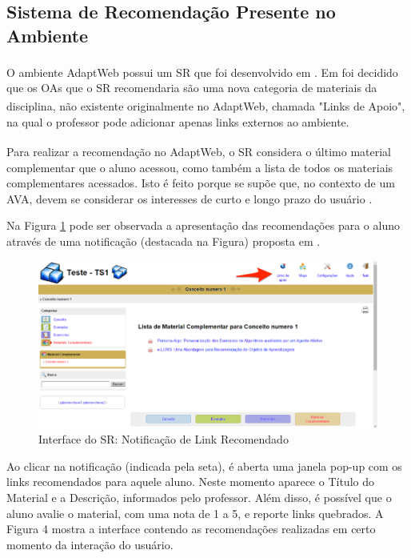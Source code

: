 \subsection{Sistema de Recomendação Presente no Ambiente}

O ambiente AdaptWeb\textsuperscript{\textregistered} possui um SR que foi desenvolvido em . Em 
foi decidido que os OAs que o SR recomendaria são uma nova categoria de materiais da disciplina, não existente
originalmente no AdaptWeb\textsuperscript{\textregistered}, chamada "Links de Apoio", na qual o professor pode adicionar apenas links externos ao ambiente.

Para realizar a recomendação no AdaptWeb\textsuperscript{\textregistered}, o SR considera o último material complementar
que o aluno acessou, como também a lista de todos os materiais complementares acessados. Isto é feito porque se supõe
que, no contexto de um AVA, devem se considerar os interesses de curto e longo prazo do usuário \cite{xiang2010temporal}.

Na Figura \ref{fig:adaptweb-notificacao-recomendacao} pode ser observada a apresentação das recomendações para o aluno
através de uma notificação (destacada na Figura) proposta em .

\begin{figure}[htb]
  \caption{\label{fig:adaptweb-notificacao-recomendacao}Interface do SR: Notificação de Link Recomendado}
  \begin{center}
      \includegraphics[scale=1.0]{./Figuras/adaptweb-notificacao-recomendacao.png}
  \end{center}
\end{figure}

Ao clicar na notificação (indicada pela seta), é aberta uma janela pop-up com os links recomendados para aquele aluno.
Neste momento aparece o Título do Material e a Descrição, informados pelo professor. Além disso, é possível que o aluno
avalie o material, com uma nota de 1 a 5, e reporte links quebrados. A Figura 4 mostra a interface contendo as
recomendações realizadas em certo momento da interação do usuário.

